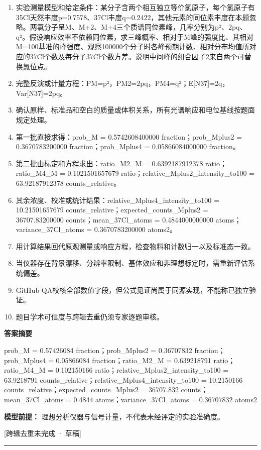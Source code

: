 \documentclass[UTF8,11pt,a4paper]{ctexart}
\begin{document}
\begin{enumerate}
\item 实验测量模型和给定条件：某分子含两个相互独立等价氯原子，每个氯原子有35Cl天然丰度p=0.7578、37Cl丰度q=0.2422，其他元素的同位素丰度在本题忽略。两氯分子呈M、M+2、M+4三个质谱同位素峰，几率分别为p²、2pq、q²。假设响应效率不依赖同位素，求三峰概率、相对于M峰的强度比、其相对M=100基准的峰强度、观察100000个分子时各峰预期计数、相对分布均值所对应的37Cl个数及每分子37Cl个数方差。说明中间峰的组合因子2来自两个可替换氯位点。
\item 完整反演或计量方程：PM=p²，PM2=2pq，PM4=q²；E[N37]=2q，Var[N37]=2pq。
\item 确认原样、标准品和空白的质量或体积关系，所有光谱响应和电位基线按题面规定处理。
\item 第一批直接求得：prob\_M = 0.5742608400000 fraction；prob\_Mplus2 = 0.3670783200000 fraction；prob\_Mplus4 = 0.05866084000000 fraction。
\item 第二批由标定和方程求出：ratio\_M2\_M = 0.6392187912378 ratio；ratio\_M4\_M = 0.1021501657679 ratio；relative\_Mplus2\_intensity\_to100 = 63.92187912378 counts\_relative。
\item 其余浓度、校准或统计结果：relative\_Mplus4\_intensity\_to100 = 10.21501657679 counts\_relative；expected\_counts\_Mplus2 = 36707.83200000 counts；mean\_37Cl\_atoms = 0.4844000000000 atoms；variance\_37Cl\_atoms = 0.3670783200000 atoms2。
\item 用计算结果回代原观测量或响应方程，检查物料和计数归一以及标准态一致。
\item 当仪器存在背景漂移、分辨率限制、基体效应和非理想标定时，需重新评估系统偏差。
\item GitHub QA校核全部数值字段，但公式见证尚属于同源实现，不能称已独立验证。
\item 题目学术可信度与跨辑去重仍须专家逐题审核。
\end{enumerate}
\noindent\textbf{答案摘要}\par
prob\_M = 0.57426084 fraction；prob\_Mplus2 = 0.36707832 fraction；prob\_Mplus4 = 0.05866084 fraction；ratio\_M2\_M = 0.639218791 ratio；ratio\_M4\_M = 0.102150166 ratio；relative\_Mplus2\_intensity\_to100 = 63.9218791 counts\_relative；relative\_Mplus4\_intensity\_to100 = 10.2150166 counts\_relative；expected\_counts\_Mplus2 = 36707.832 counts；mean\_37Cl\_atoms = 0.4844 atoms；variance\_37Cl\_atoms = 0.36707832 atoms2\par
\noindent\textbf{模型前提：}
理想分析仪器与信号计量，不代表未经评定的实验准确度。\par
\noindent\textcolor{red!65!black}{[跨辑去重未完成 · 草稿]} \par
\medskip\hrule\medskip
{}
\end{document}
